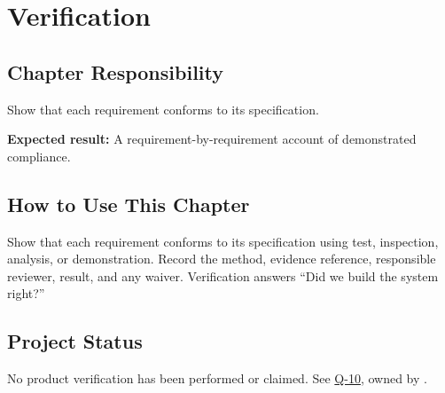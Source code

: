 \chapter{Verification}
\section{Chapter Responsibility}
\label{Section:VerificationResponsibility}
Show that each requirement conforms to its specification.

\noindent\textbf{Expected result:} A requirement-by-requirement account of demonstrated compliance.

\section{How to Use This Chapter}
Show that each requirement conforms to its specification using test, inspection, analysis, or demonstration. Record the method, evidence reference, responsible reviewer, result, and any waiver.
Verification answers ``Did we build the system right?''


\section{Project Status}
No product verification has been performed or claimed.
See \hyperref[Question:Q-10]{Q-10}, owned by \DocumentOwner.

